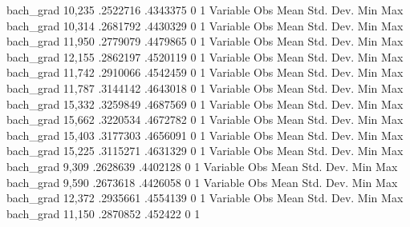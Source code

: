    bach_grad {\VBAR}     10,235    .2522716    .4343375          0          1
{\smallskip}
    Variable {\VBAR}        Obs        Mean    Std. Dev.       Min        Max
   bach_grad {\VBAR}     10,314    .2681792    .4430329          0          1
{\smallskip}
    Variable {\VBAR}        Obs        Mean    Std. Dev.       Min        Max
   bach_grad {\VBAR}     11,950    .2779079    .4479865          0          1
{\smallskip}
    Variable {\VBAR}        Obs        Mean    Std. Dev.       Min        Max
   bach_grad {\VBAR}     12,155    .2862197    .4520119          0          1
{\smallskip}
    Variable {\VBAR}        Obs        Mean    Std. Dev.       Min        Max
   bach_grad {\VBAR}     11,742    .2910066    .4542459          0          1
{\smallskip}
    Variable {\VBAR}        Obs        Mean    Std. Dev.       Min        Max
   bach_grad {\VBAR}     11,787    .3144142    .4643018          0          1
{\smallskip}
    Variable {\VBAR}        Obs        Mean    Std. Dev.       Min        Max
   bach_grad {\VBAR}     15,332    .3259849    .4687569          0          1
{\smallskip}
    Variable {\VBAR}        Obs        Mean    Std. Dev.       Min        Max
   bach_grad {\VBAR}     15,662    .3220534    .4672782          0          1
{\smallskip}
    Variable {\VBAR}        Obs        Mean    Std. Dev.       Min        Max
   bach_grad {\VBAR}     15,403    .3177303    .4656091          0          1
{\smallskip}
    Variable {\VBAR}        Obs        Mean    Std. Dev.       Min        Max
   bach_grad {\VBAR}     15,225    .3115271    .4631329          0          1
{\smallskip}
    Variable {\VBAR}        Obs        Mean    Std. Dev.       Min        Max
   bach_grad {\VBAR}      9,309    .2628639    .4402128          0          1
{\smallskip}
    Variable {\VBAR}        Obs        Mean    Std. Dev.       Min        Max
   bach_grad {\VBAR}      9,590    .2673618    .4426058          0          1
{\smallskip}
    Variable {\VBAR}        Obs        Mean    Std. Dev.       Min        Max
   bach_grad {\VBAR}     12,372    .2935661    .4554139          0          1
{\smallskip}
    Variable {\VBAR}        Obs        Mean    Std. Dev.       Min        Max
   bach_grad {\VBAR}     11,150    .2870852     .452422          0          1
